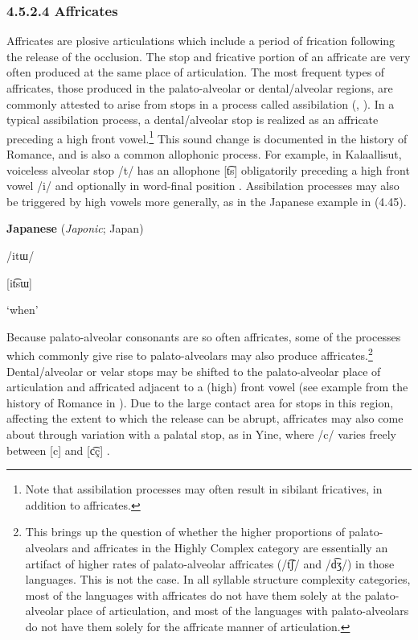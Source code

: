 \subsubsection{\textbf{4.5.2.4} \textbf{Affricates}}

  Affricates are plosive articulations which include a period of frication following the release of the occlusion. The stop and fricative portion of an affricate are very often produced at the same place of articulation. The most frequent types of affricates, those produced in the palato-alveolar or dental/alveolar regions, are commonly attested to arise from stops in a process called assibilation (\citealt{HallHamann2006}, \citealt{Telfer2006}). In a typical assibilation process, a dental/alveolar stop is realized as an affricate preceding a high front vowel.\footnote{ \textrm{Note that assibilation processes may often result in sibilant fricatives, in addition to affricates.}} This sound change is documented in the history of Romance, and is also a common allophonic process. For example, in Kalaallisut, voiceless alveolar stop /t/ has an allophone [t͡s] obligatorily preceding a high front vowel /i/ and optionally in word-final position \citep[333]{Fortescue1984}. Assibilation processes may also be triggered by high vowels more generally, as in the Japanese example in (4.45).

\ea\label{ex:(4.45)}
  \textbf{Japanese} (\textit{Japonic}; Japan)

/itɯ/

[it͡sɯ]

‘when’

\citep[22]{Tsujimura2013}

\z

  Because palato-alveolar consonants are so often affricates, some of the processes which commonly give rise to palato-alveolars may also produce affricates.\footnote{ \textrm{This brings up the question of whether the higher proportions of palato-alveolars and affricates in the Highly Complex category are essentially an artifact of higher rates of palato-alveolar affricates (/t͡ʃ/ and /d͡ʒ/) in those languages. This is not the case. In all syllable structure complexity categories, most of the languages with affricates do not have them solely at the palato-alveolar place of articulation, and most of the languages with palato-alveolars do not have them solely for the affricate manner of articulation.}} Dental/alveolar or velar stops may be shifted to the palato-alveolar place of articulation and affricated adjacent to a (high) front vowel (see example from the history of Romance in ). Due to the large contact area for stops in this region, affecting the extent to which the release can be abrupt, affricates may also come about through variation with a palatal stop, as in Yine, where /c/ varies freely between [c] and [c͡ç] \citep[17-18]{Hanson2010}.

